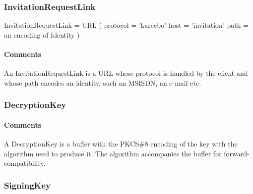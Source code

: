 \documentclass[a4paper,10pt]{article}
\begin{document}
\subsubsection{InvitationRequestLink}

\begin{verbbox}
InvitationRequestLink = URL
(
  protocol = 'kareebo'
  host = 'invitation'
  path = an encoding of Identity
)
\end{verbbox}
\begin{center}
\theverbbox
\end{center}

\begin{inparaitem}[ ]
 \item \infrastructure
\end{inparaitem}

\paragraph*{Comments}
An InvitationRequestLink is a URL whose protocol is handled by the client and whose path encodes an identity, such an MSISDN, an e-mail etc.

\subsubsection{DecryptionKey}

\begin{center}
\theverbbox
\end{center}

\begin{inparaitem}[ ]
 \item \infrastructure
\end{inparaitem}

\paragraph*{Comments}
A DecryptionKey is a buffer with the PKCS\#8 encoding of the key with the algorithm used to produce it. The algorithm accompanies the buffer for forward-compatibility.

\subsubsection{SigningKey}
\end{document}
